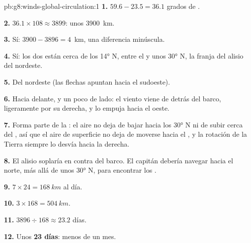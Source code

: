 \begin{solution}{pb:g8:winds-global-circulation:1}
\textbf{1.} $59.6 - 23.5 = 36.1$ grados de .

\textbf{2.} $36.1 \times 108 \approx 3899$: unos \qty{3900}{km}.

\textbf{3.} Sí: $3900 - 3896 = 4$~km, una diferencia minúscula.

\textbf{4.} Sí: los dos están cerca de los \ang{14} N, entre el  y
unos \ang{30} N, la franja del alisio del nordeste.

\textbf{5.} Del nordeste (las flechas apuntan hacia el sudoeste).

\textbf{6.} Hacia delante, y un poco de lado: el viento viene de detrás
del barco, ligeramente por su derecha, y lo empuja hacia el oeste.

\textbf{7.} Forma parte de la : el aire no deja de
bajar hacia los \ang{30} N ni de subir cerca del , así que el aire
de superficie no deja de moverse hacia el , y la rotación de la
Tierra siempre lo desvía hacia la derecha.

\textbf{8.} El alisio soplaría en contra del barco. El capitán debería
navegar hacia el norte, más allá de unos \ang{30} N, para encontrar los
.

\textbf{9.} $7 \times 24 = \qty{168}{km}$ al día.

\textbf{10.} $3 \times 168 = \qty{504}{km}$.

\textbf{11.} $3896 \div 168 \approx 23.2$ días.

\textbf{12.} Unos \textbf{23 días}: menos de un mes.
\end{solution}
